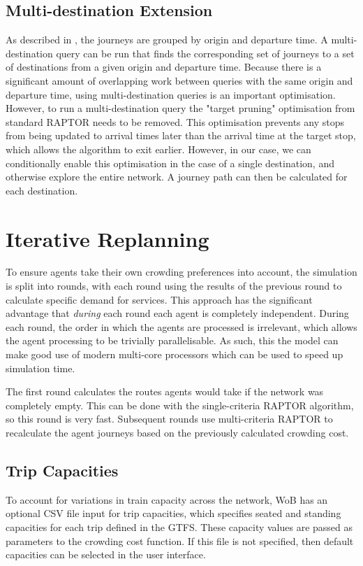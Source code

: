 \subsection{Multi-destination Extension}
As described in , the journeys are grouped by origin and departure time. A multi-destination query can be run that finds the corresponding set of journeys to a set of destinations from a given origin and departure time. Because there is a significant amount of overlapping work between queries with the same origin and departure time, using multi-destination queries is an important optimisation. However, to run a multi-destination query the "target pruning" optimisation from standard RAPTOR needs to be removed. This optimisation prevents any stops from being updated to arrival times later than the arrival time at the target stop, which allows the algorithm to exit earlier. However, in our case, we can conditionally enable this optimisation in the case of a single destination, and otherwise explore the entire network. A journey path can then be calculated for each destination.

\section{Iterative Replanning}
To ensure agents take their own crowding preferences into account, the simulation is split into rounds, with each round using the results of the previous round to calculate specific demand for services. This approach has the significant advantage that \emph{during} each round each agent is completely independent. During each round, the order in which the agents are processed is irrelevant, which allows the agent processing to be trivially parallelisable. As such, this the model can make good use of modern multi-core processors which can be used to speed up simulation time.

The first round calculates the routes agents would take if the network was completely empty. This can be done with the single-criteria RAPTOR algorithm, so this round is very fast. Subsequent rounds use multi-criteria RAPTOR to recalculate the agent journeys based on the previously calculated crowding cost. 

\subsection{Trip Capacities}
To account for variations in train capacity across the network, WoB has an optional CSV file input for trip capacities, which specifies seated and standing capacities for each trip defined in the GTFS. These capacity values are passed as parameters to the crowding cost function. If this file is not specified, then default capacities can be selected in the user interface.

